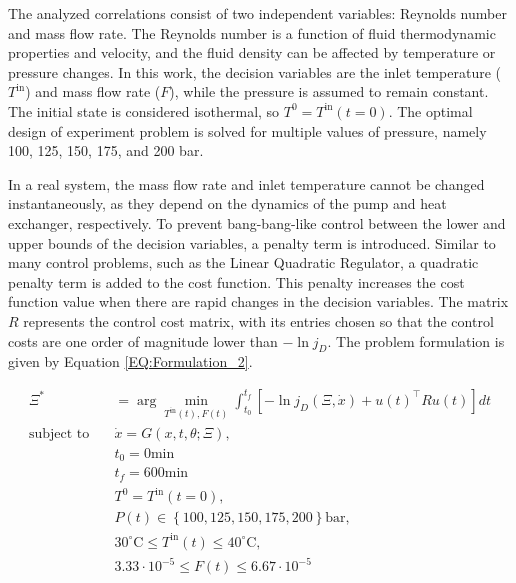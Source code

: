 \documentclass[../Article_Design_of_Experiment.tex]{subfiles}
\begin{document}
	The analyzed correlations consist of two independent variables: Reynolds number and mass flow rate. The Reynolds number is a function of fluid thermodynamic properties and velocity, and the fluid density can be affected by temperature or pressure changes. In this work, the decision variables are the inlet temperature ($T^{\text{in}}$) and mass flow rate ($F$), while the pressure is assumed to remain constant. The initial state is considered isothermal, so $T^0 = T^{\text{in}}(t=0)$. The optimal design of experiment problem is solved for multiple values of pressure, namely 100, 125, 150, 175, and 200 bar.
	
	In a real system, the mass flow rate and inlet temperature cannot be changed instantaneously, as they depend on the dynamics of the pump and heat exchanger, respectively. To prevent bang-bang-like control between the lower and upper bounds of the decision variables, a penalty term is introduced. Similar to many control problems, such as the Linear Quadratic Regulator, a quadratic penalty term is added to the cost function. This penalty increases the cost function value when there are rapid changes in the decision variables. The matrix $R$ represents the control cost matrix, with its entries chosen so that the control costs are one order of magnitude lower than $-\ln j_D$. The problem formulation is given by Equation \ref{EQ:Formulation_2}.
	
	{\footnotesize 
		\begin{equation} 
			\begin{aligned} \Xi^* &= \arg \min_{ T^{\text{in}}(t), F(t) } \int_{t_0}^{t_f} \left[ - \ln j_D(\Xi, \dot{x}) + u(t)^\top R u(t) \right] dt \\ 
				\text{subject to} \quad & \dot{x} = G(x, t, \theta; \Xi), \\ 
				& t_0 = 0 \text{min} \\ 
				& t_f = 600 \text{min} \\ 
				& T^{0} = T^{\text{in}}(t=0), \\ 
				& P(t) \in \left\{100, 125, 150, 175, 200\right\} \text{bar}, \\ 
				& 30^\circ\text{C} \leq T^{\text{in}}(t) \leq 40^\circ\text{C}, \\ 
				& 3.33 \cdot 10^{-5} \leq F(t) \leq 6.67 \cdot 10^{-5} 
				\end{aligned} 
				\label{EQ:Formulation_2} 
			\end{equation} }
	
\end{document}
